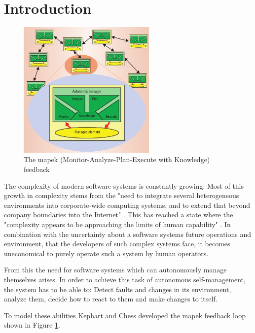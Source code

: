 \section{Introduction}
\label{ch:Introduction}

\begin{figure}[hbt!]
    \centering
    \includegraphics[width=0.6\textwidth]{images/MAPEK.png}
    \caption{The \acrshort{mapek} (Monitor-Analyze-Plan-Execute with Knowledge) feedback \cite*{VisionOfAutonomicComputing}}
    \label{fig:MAPEK}
\end{figure}

The complexity of modern software systems is constantly growing.
Most of this growth in complexity stems from the
"need to integrate several heterogeneous environments into corporate-wide computing systems,
and to extend that beyond company boundaries into the Internet" \cite*{VisionOfAutonomicComputing}.
This has reached a state where the
"complexity appears to be approaching the limits of human capability" \cite*{VisionOfAutonomicComputing}.
In combination with the uncertainty about a software systems future operations and environment,
that the developers of such complex systems face, it becomes uneconomical to purely operate such a system by human operators.

\noindent From this the need for software systems which can autonomously manage themselves arises.
In order to achieve this task of autonomous self-management, the system has to be able to:
Detect faults and changes in its environment, analyze them, decide how to react to them and make changes to itself.

\noindent To model these abilities Kephart and Chess developed
the \acrfull{mapek} feedback loop \cite*{VisionOfAutonomicComputing} shown in Figure \ref{fig:MAPEK}.

